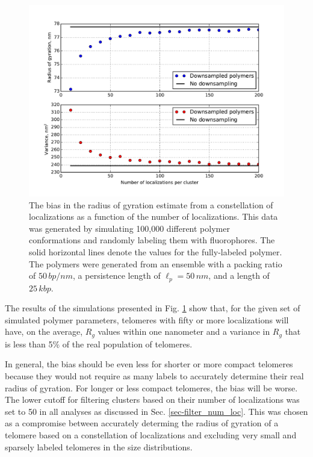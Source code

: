 \documentclass[12pt, a4paper]{article}
\begin{document}
\begin{figure}
  \centering
  \includegraphics[scale = 0.75]{fig-downsampling_subplots.pdf}
  \caption{The bias in the radius of gyration estimate from a constellation of localizations as a function of the number of localizations. This data was generated by simulating 100,000 different polymer conformations and randomly labeling them with fluorophores. The solid horizontal lines denote the values for the fully-labeled polymer. The polymers were generated from an ensemble with a packing ratio of $50 \, bp/nm$, a persistence length of $\ell_p = 50 \, nm$, and a length of $25 \, kbp$.}
  \label{fig-downsampling}
\end{figure}

The results of the simulations presented in
Fig. \ref{fig-downsampling} show that, for the given set of
simulated polymer parameters, telomeres with fifty or more
localizations will have, on the average, $R_g$ values within one
nanometer and a variance in $R_g$ that is less than 5\% of the
real population of telomeres.

In general, the bias should be even less for shorter or more
compact telomeres because they would not require as many labels to
accurately determine their real radius of gyration. For longer or
less compact telomeres, the bias will be worse. The lower cutoff
for filtering clusters based on their number of localizations was
set to 50 in all analyses as discussed in
Sec. \ref{sec-filter_num_loc}. This was chosen as a compromise
between accurately determing the radius of gyration of a telomere
based on a constellation of localizations and excluding very small
and sparsely labeled telomeres in the size distributions.
\end{document}
